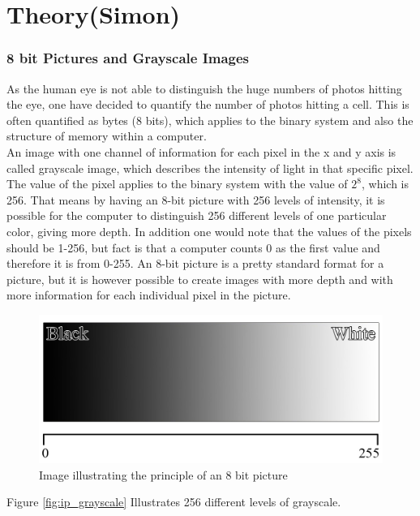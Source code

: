 
\chapter{Theory(Simon)}
\subsection{8 bit Pictures and Grayscale Images}
As the human eye is not able to distinguish the huge numbers of photos hitting the eye, one have decided to quantify the number of photos hitting a cell. This is often quantified as bytes (8 bits), which applies to the binary system and also the structure of memory within a computer.\\
An image with one channel of information for each pixel in the x and y axis is called grayscale image, which describes the intensity of light in that specific pixel. The value of the pixel applies to the binary system with the value of $2^8$, which is 256. That means by having an 8-bit picture with 256 levels of intensity, it is possible for the computer to distinguish 256 different levels of one particular color, giving more depth. In addition one would note that the values of the pixels should be 1-256, but fact is that a computer counts 0 as the first value and therefore it is from 0-255. An 8-bit picture is a pretty standard format for a picture, but it is however possible to create images with more depth and with more information for each individual pixel in the picture.\\

\begin{figure}[htbp]
\centering
\includegraphics[width=1.00\textwidth]{Pictures/Theory/Grayscale.jpg}
\caption{Image illustrating the principle of an 8 bit picture}
\label{fig:ip_grayscale}
\end{figure}
Figure \eqref{fig:ip_grayscale} Illustrates 256 different levels of grayscale.\\

